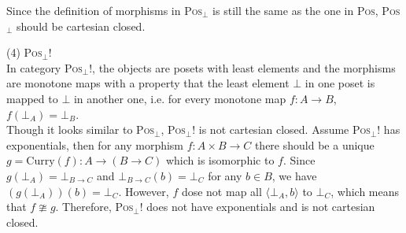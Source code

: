 \begin{myitemize}
Since the definition of morphisms in \textsc{Pos}$_\bot$ is still the same as the one in \textsc{Pos}, \textsc{Pos}$_\bot$ should be cartesian closed.
\item[(4)] \textsc{Pos}$_\bot !$ \\
In category \textsc{Pos}$_\bot !$, the objects are posets with least elements and the morphisms are monotone maps with a property that the least element $ \bot $ in one poset is mapped to $ \bot $ in another one, i.e. for every monotone map $ f: A \to B $, $ f( \bot _A ) = \bot _B $.\\
Though it looks similar to \textsc{Pos}$_\bot$, \textsc{Pos}$_\bot !$ is not cartesian closed. Assume \textsc{Pos}$_\bot !$ has exponentials, then for any morphism $ f: A \times B \to C $ there should be a unique $ g = \text{Curry}(f): A \to (B \to C) $ which is isomorphic to $ f $. Since $ g(\bot _A)= \bot _{B \to C} $ and $ \bot _{B \to C} (b) = \bot _C $ for any $ b \in B $, we have $ (g(\bot _A))(b) = \bot _C $. However, $ f $ dose not map all $ \langle \bot _A , b \rangle $ to $ \bot _C $, which means that $ f \ncong g $. Therefore, \textsc{Pos}$_\bot !$ does not have exponentials and is not cartesian closed.
\end{myitemize}